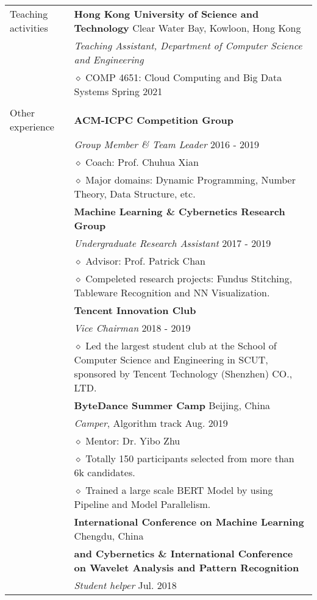 \documentclass[letterpaper, 11pt]{article}
\begin{document}
\begin{longtable}{p{1.3in}p{4.8in}}
{Teaching activities}
& \textbf{Hong Kong University of Science and Technology} \hfill Clear Water Bay, Kowloon, Hong Kong \\
& \textit{Teaching Assistant, Department of Computer Science and Engineering} \\
& $\diamond$ COMP 4651: Cloud Computing and Big Data Systems \hfill Spring 2021 \\
& \\

{Other experience}
& \textbf{ACM-ICPC Competition Group} \\
& \textit{Group Member \& Team Leader} \hfill 2016 - 2019 \\
& $\diamond$ Coach: Prof. Chuhua Xian \\
& $\diamond$ Major domains: Dynamic Programming, Number Theory, Data Structure, etc. \\

& \textbf{Machine Learning \& Cybernetics Research Group} \\
& \textit{Undergraduate Research Assistant} \hfill 2017 - 2019 \\
& $\diamond$ Advisor: Prof. Patrick Chan \\
& $\diamond$ Compeleted research projects: Fundus Stitching, Tableware Recognition and NN Visualization. \\

& \textbf{Tencent Innovation Club} \\
& \textit{Vice Chairman} \hfill 2018 - 2019 \\
& $\diamond$ Led the largest student club at the School of Computer Science and Engineering in SCUT, sponsored by Tencent Technology (Shenzhen) CO., LTD. \\

& \textbf{ByteDance Summer Camp} \hfill Beijing, China \\
& \textit{Camper}, Algorithm track \hfill Aug. 2019 \\
& $\diamond$ Mentor: Dr. Yibo Zhu \\
& $\diamond$ Totally 150 participants selected from more than 6k candidates. \\
& $\diamond$ Trained a large scale BERT Model by using Pipeline and Model Parallelism. \\

& \textbf{International Conference on Machine Learning} \hfill Chengdu, China \\
& \textbf{and Cybernetics \& International Conference on Wavelet Analysis and Pattern Recognition} \\
& \textit{Student helper} \hfill Jul. 2018 \\


\end{longtable}
\end{document}
